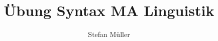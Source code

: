 

\title{Übung Syntax MA Linguistik}


\author{Stefan Müller}





\huberlintitlepage[22pt]


\newtoggle{ba-linguistik}\togglefalse{ba-linguistik}
















